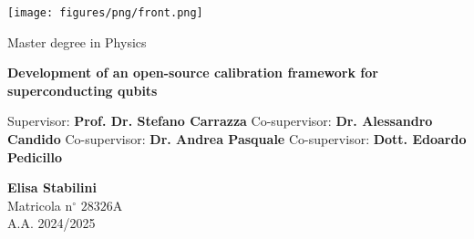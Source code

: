 \frontmatter
{
\thispagestyle{empty}

\centerline{
\texttt{[image: figures/png/front.png]}
}

\begin{center}
{\Large  Master degree in Physics }
\end{center}


\vskip1.5cm
\begin{center}
{\fontsize{15}{20}\selectfont \textbf{Development of an open-source calibration framework for superconducting qubits\\}}
\end{center}


{\large
\vskip 20mm Supervisor:
\vskip 0.2mm \large  \textbf{Prof. Dr. Stefano Carrazza}
\vskip 5mm
\large Co-supervisor:
\vskip 0.2mm
\large \textbf{Dr. Alessandro Candido}
\vskip 5mm
\large Co-supervisor:
\vskip 0.2mm
\large \textbf{Dr. Andrea Pasquale}
\vskip 5mm
\large Co-supervisor:
\vskip 0.2mm
\large \textbf{Dott. Edoardo Pedicillo}
}
}

\vskip 2cm
\noindent
\hfill
\parbox[t]{7cm}{
    \large
    \raggedright
    \textbf{Elisa Stabilini} \\
    Matricola n$^\circ$ $28326\mathrm{A}$ \\
    A.A. 2024/2025
}  